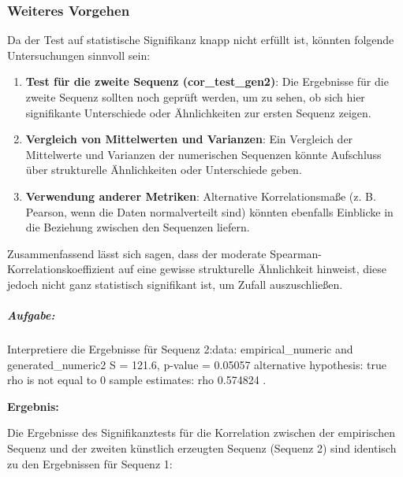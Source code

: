 \documentclass[
]{article}
\begin{document}
\subsubsection{\texorpdfstring{\textbf{Weiteres
Vorgehen}}{Weiteres Vorgehen}}\label{weiteres-vorgehen}

Da der Test auf statistische Signifikanz knapp nicht erfüllt ist,
könnten folgende Untersuchungen sinnvoll sein:

\begin{enumerate}
\def\labelenumi{\arabic{enumi}.}
\item
  \textbf{Test für die zweite Sequenz (cor\_test\_gen2)}: Die Ergebnisse
  für die zweite Sequenz sollten noch geprüft werden, um zu sehen, ob
  sich hier signifikante Unterschiede oder Ähnlichkeiten zur ersten
  Sequenz zeigen.
\item
  \textbf{Vergleich von Mittelwerten und Varianzen}: Ein Vergleich der
  Mittelwerte und Varianzen der numerischen Sequenzen könnte Aufschluss
  über strukturelle Ähnlichkeiten oder Unterschiede geben.
\item
  \textbf{Verwendung anderer Metriken}: Alternative Korrelationsmaße (z.
  B. Pearson, wenn die Daten normalverteilt sind) könnten ebenfalls
  Einblicke in die Beziehung zwischen den Sequenzen liefern.
\end{enumerate}

Zusammenfassend lässt sich sagen, dass der moderate
Spearman-Korrelationskoeffizient auf eine gewisse strukturelle
Ähnlichkeit hinweist, diese jedoch nicht ganz statistisch signifikant
ist, um Zufall auszuschließen.

\subparagraph{\texorpdfstring{
\textbf{Aufgabe:}}{ Aufgabe:}}\label{aufgabe-5}

Interpretiere die Ergebnisse für Sequenz 2:\textquotesingle data:
empirical\_numeric and generated\_numeric2 S = 121.6, p-value = 0.05057
alternative hypothesis: true rho is not equal to 0 sample estimates: rho
0.574824 \textquotesingle.

\textbf{Ergebnis:}

Die Ergebnisse des Signifikanztests für die Korrelation zwischen der
empirischen Sequenz und der zweiten künstlich erzeugten Sequenz (Sequenz
2) sind identisch zu den Ergebnissen für Sequenz 1:
\end{document}
